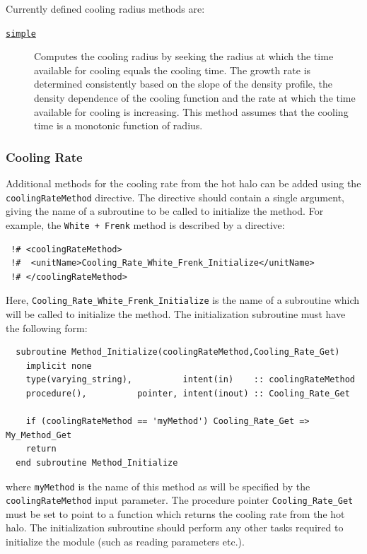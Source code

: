 Currently defined cooling radius methods are:
\begin{description}
 \item [\hyperlink{cooling.cooling_radius.simple.F90:cooling_radii_simple:cooling_radius_simple}{{\tt simple}}] Computes the cooling radius by seeking the radius at which the time available for cooling equals the cooling time. The growth rate is determined consistently based on the slope of the density profile, the density dependence of the cooling function and the rate at which the time available for cooling is increasing. This method assumes that the cooling time is a monotonic function of radius.
\end{description}

\subsubsection{Cooling Rate}

Additional methods for the cooling rate from the hot halo can be added using the {\tt coolingRateMethod} directive. The directive should contain a single argument, giving the name of a subroutine to be called to initialize the method. For example, the {\tt White + Frenk} method is described by a directive:
\begin{verbatim}
 !# <coolingRateMethod>
 !#  <unitName>Cooling_Rate_White_Frenk_Initialize</unitName>
 !# </coolingRateMethod>
\end{verbatim}
Here, {\tt Cooling\_Rate\_White\_Frenk\_Initialize} is the name of a subroutine which will be called to initialize the method. The initialization subroutine must have the following form:
\begin{verbatim}
  subroutine Method_Initialize(coolingRateMethod,Cooling_Rate_Get)
    implicit none
    type(varying_string),          intent(in)    :: coolingRateMethod
    procedure(),          pointer, intent(inout) :: Cooling_Rate_Get
    
    if (coolingRateMethod == 'myMethod') Cooling_Rate_Get => My_Method_Get
    return
  end subroutine Method_Initialize
\end{verbatim}
where {\tt myMethod} is the name of this method as will be specified by the {\tt coolingRateMethod} input parameter. The procedure pointer {\tt Cooling\_Rate\_Get} must be set to point to a function which returns the cooling rate from the hot halo. The initialization subroutine should perform any other tasks required to initialize the module (such as reading parameters etc.).

